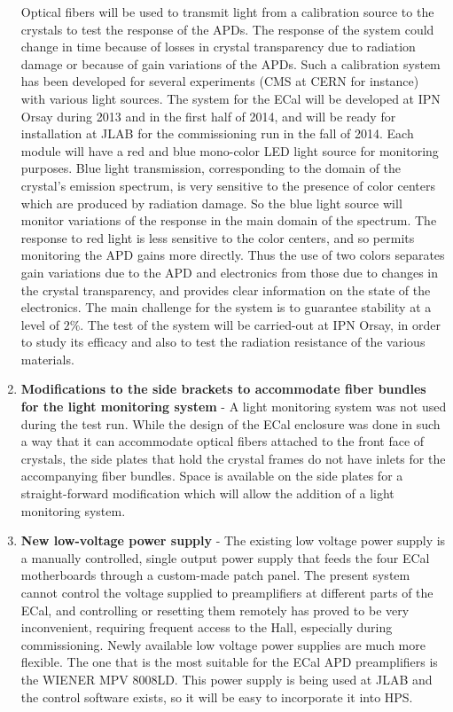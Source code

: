 \begin{enumerate}
Optical fibers will be used to transmit light from a calibration  source to the crystals to test the response of the APDs. The response of the system could change in time because of 
losses in crystal transparency due to radiation damage or because of gain variations of the APDs. 
Such a calibration system has been developed for several experiments (CMS at CERN for instance) with various light sources. The system for the ECal 
will be developed at IPN Orsay during 2013 and in the first half of 2014, and will be ready for installation at JLAB for the commissioning run in the fall of 2014. Each module will have a red and blue mono-color LED light source for monitoring purposes. 
Blue light transmission, corresponding to the domain of the crystal's emission spectrum, is very sensitive to the presence of color centers which are produced by radiation damage. So the blue light source will monitor variations of the response in the main domain of the spectrum.
The response to red light is less sensitive to the color centers,  and so permits monitoring the APD gains more directly. Thus the use of two colors separates gain variations due to the 
APD and electronics from those due to changes in the crystal transparency, and provides clear information on the state of the electronics. 
The main challenge for the system is to guarantee stability at a level of $2\%$. The test of the system will be carried-out at
IPN Orsay, in order to study its efficacy and also to test the radiation resistance of the various materials.

\item {\bf Modifications to the side brackets to accommodate fiber bundles for the light monitoring system} -
A light monitoring system was not used during the test run. While the design of the ECal enclosure was done in such a way that it can 
accommodate optical fibers attached to the front face of crystals, the side plates that hold the crystal frames do not have inlets for the accompanying fiber bundles.
Space is available on the side plates for a straight-forward modification which will allow the addition of a light monitoring system.  
    
\item {\bf New low-voltage power supply} - The existing low voltage power supply is a manually controlled, single output power supply 
that feeds the four ECal motherboards through a custom-made patch panel. The present system cannot control the voltage supplied to preamplifiers at different
parts of the ECal, and controlling or resetting them remotely has proved to be very inconvenient, requiring frequent access to the Hall, especially during commissioning. Newly available low voltage power supplies are much more flexible. The one that is the most suitable for the
ECal APD preamplifiers is the WIENER MPV 8008LD. This power supply is being used at JLAB and the control software exists, so it will be easy to incorporate it into HPS.     


\end{enumerate}
